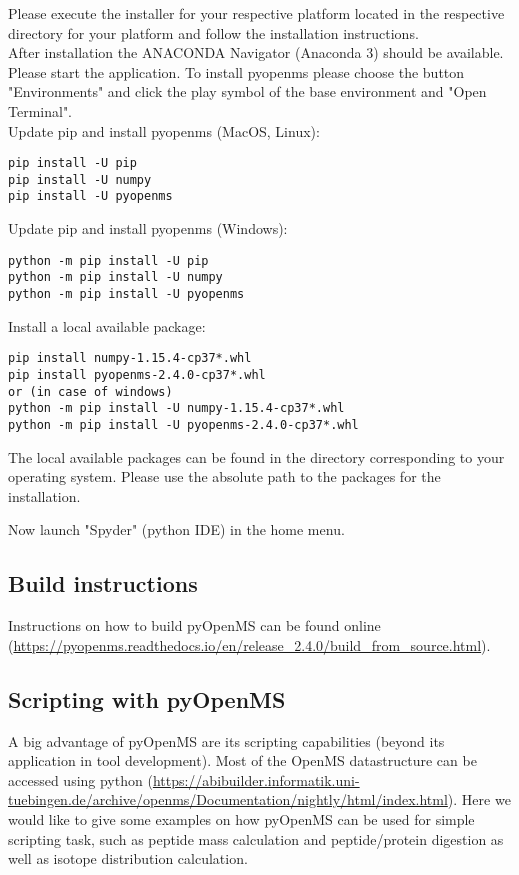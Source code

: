 {\noindent Please execute the installer for your respective platform located in the respective directory for your platform and follow the installation instructions. \\

\noindent After installation the ANACONDA Navigator (Anaconda 3) should be available. Please start the application. To install pyopenms please choose the button "Environments" and click the play symbol of the base environment and "Open Terminal". \\

\noindent  Update pip and install pyopenms (MacOS, Linux):
\begin{lstlisting}
pip install -U pip
pip install -U numpy
pip install -U pyopenms
\end{lstlisting}

\noindent  Update pip and install pyopenms (Windows):
\begin{lstlisting}
python -m pip install -U pip
python -m pip install -U numpy
python -m pip install -U pyopenms
\end{lstlisting}

\noindent Install a local available package:
\begin{lstlisting}
pip install numpy-1.15.4-cp37*.whl
pip install pyopenms-2.4.0-cp37*.whl
or (in case of windows)
python -m pip install -U numpy-1.15.4-cp37*.whl
python -m pip install -U pyopenms-2.4.0-cp37*.whl
\end{lstlisting}

\noindent The local available packages can be found in the directory corresponding to your operating system. Please use the absolute path to the packages for the installation.
    
\noindent  Now launch "Spyder" (python IDE) in the home menu.

\subsection{Build instructions}
Instructions on how to build pyOpenMS can be found online (\url{https://pyopenms.readthedocs.io/en/release_2.4.0/build_from_source.html}).

\subsection{Scripting with pyOpenMS}
A big advantage of pyOpenMS are its scripting capabilities (beyond its application in tool development). Most of the OpenMS datastructure can be accessed using python (\url{https://abibuilder.informatik.uni-tuebingen.de/archive/openms/Documentation/nightly/html/index.html}). Here we would like to give some examples on how pyOpenMS can be used for simple scripting task, such as peptide mass calculation and peptide/protein digestion as well as isotope distribution calculation. \\

}
